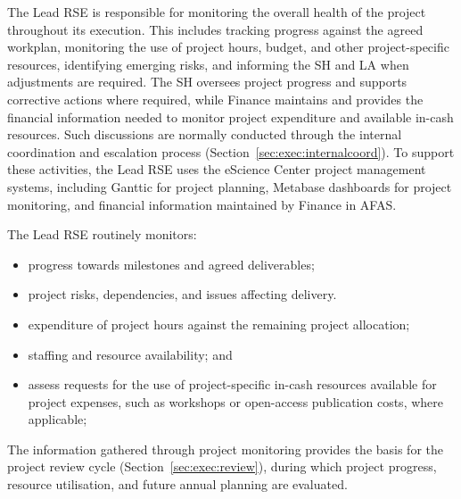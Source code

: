 The Lead RSE is responsible for monitoring the overall health of the project throughout its execution. This includes
tracking progress against the agreed workplan, monitoring the use of project hours, budget, and other project-specific
resources, identifying emerging risks, and informing the SH and LA when adjustments are required. The SH oversees
project progress and supports corrective actions where required, while Finance maintains and provides the financial
information needed to monitor project expenditure and available in-cash resources. Such discussions are normally
conducted through the internal coordination and escalation process (Section~\ref{sec:exec:internalcoord}). To
support these activities, the Lead RSE uses the eScience Center project management systems, including Ganttic for
project planning, Metabase dashboards for project monitoring, and financial information maintained by Finance in
AFAS.

The Lead RSE routinely monitors:
\vspace{-0.2cm}
\begin{itemize}
\item progress towards milestones and agreed deliverables;
\item project risks, dependencies, and issues affecting delivery.
\item expenditure of project hours against the remaining project allocation;
\item staffing and resource availability; and
\item assess requests for the use of project-specific in-cash resources available for project expenses, such as 
workshops or open-access publication costs, where applicable;
\end{itemize}
\vspace{-0.2cm}

The information gathered through project monitoring provides the basis for the project review cycle
(Section~\ref{sec:exec:review}), during which project progress, resource utilisation, and future annual planning 
are evaluated.

